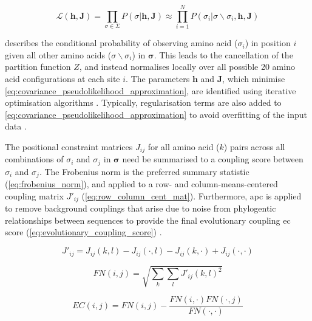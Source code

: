 \begin{equation}
    \mathcal{L}\left(\mathbf{h},\mathbf{J}\right)=\prod_{\sigma\in\Sigma}P\left(\sigma\rvert\mathbf{h},\mathbf{J}\right)\approx\prod_{i=1}^{N}P\left(\sigma_i\rvert\sigma\backslash\sigma_i,\mathbf{h},\mathbf{J}\right)
    \label{eq:covariance_pseudolikelihood_approximation}
\end{equation}

 describes the conditional probability of observing amino acid ($\sigma_i$) in position $i$ given all other amino acids ($\sigma\backslash\sigma_i$) in $\boldsymbol{\sigma}$. This leads to the cancellation of the partition function $Z$, and instead normalises locally over all possible 20 amino acid configurations at each site $i$. The parameters $\mathbf{h}$ and $\mathbf{J}$, which minimise \cref{eq:covariance_pseudolikelihood_approximation}, are identified using iterative optimisation algorithms \cite{Hopf2017-pp}. Typically, regularisation terms are also added to \cref{eq:covariance_pseudolikelihood_approximation} to avoid overfitting of the input data \cite{Hopf2017-pp}.

The positional constraint matrices $J_{ij}$ for all amino acid ($k$) pairs across all combinations of $\sigma_i$ and $\sigma_j$ in $\boldsymbol{\sigma}$ need be summarised to a coupling score between $\sigma_i$ and $\sigma_j$. The Frobenius norm is the preferred summary statistic (\cref{eq:frobenius_norm}), and applied to a row- and column-means-centered coupling matrix $J'_{ij}$ (\cref{eq:row_column_cent_mat}). Furthermore, \gls{apc} is applied to remove background couplings that arise due to noise from phylogentic relationships between sequences to provide the final evolutionary coupling \gls{ec} score (\cref{eq:evolutionary_coupling_score}) \cite{Dunn2008-ao,Jones2012-ks,Ekeberg2013-ay,Kamisetty2013-le,Seemayer2014-zp}.

\begin{equation}
    J'_{ij}=J_{ij}(k,l)-J_{ij}(\cdot,l)-J_{ij}(k,\cdot)+J_{ij}(\cdot,\cdot)
    \label{eq:row_column_cent_mat}
\end{equation}

\begin{equation}
    FN(i,j)=\sqrt{\sum_{k}\sum_{l}J'_{ij}(k,l)^2}
    \label{eq:frobenius_norm}
\end{equation}

\begin{equation}
    EC(i,j)=FN(i,j)-\frac{FN(i,\cdot)FN(\cdot,j)}{FN(\cdot,\cdot)}
    \label{eq:evolutionary_coupling_score}
\end{equation}


